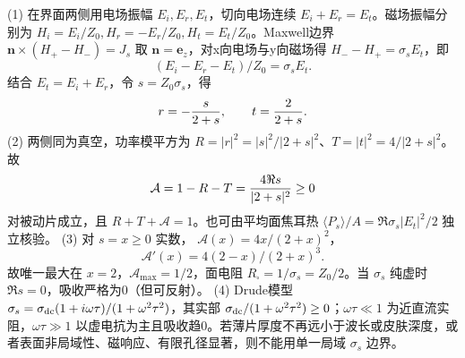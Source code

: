 (1) 在界面两侧用电场振幅 \(E_i,E_r,E_t\)，切向电场连续 \(E_i+E_r=E_t\)。磁场振幅分别为 \(H_i=E_i/Z_0,H_r=-E_r/Z_0,H_t=E_t/Z_0\)。Maxwell边界 \(\boldsymbol n\times(H_+-H_-)=J_s\) 取 \(\boldsymbol n=\boldsymbol e_z\)，对x向电场与y向磁场得 \(H_- -H_+=\sigma_sE_t\)，即
\[
(E_i-E_r-E_t)/Z_0=\sigma_sE_t.
\]
结合 \(E_t=E_i+E_r\)，令 \(s=Z_0\sigma_s\)，得
\[
r=-{s\over2+s},\qquad t={2\over2+s}.
\]
(2) 两侧同为真空，功率模平方为 \(R=|r|^2=|s|^2/|2+s|^2\)、\(T=|t|^2=4/|2+s|^2\)。故
\[
\mathcal A=1-R-T={4\Re s\over|2+s|^2}\ge0
\]
对被动片成立，且 \(R+T+\mathcal A=1\)。也可由平均面焦耳热 \(\langle P_s\rangle/A=\Re\sigma_s|E_t|^2/2\) 独立核验。
(3) 对 \(s=x\ge0\) 实数，
\(\mathcal A(x)=4x/(2+x)^2\)，
\[
\mathcal A'(x)=4(2-x)/(2+x)^3.
\]
故唯一最大在 \(x=2\)，\(\mathcal A_{\max}=1/2\)，面电阻 \(R_\square=1/\sigma_s=Z_0/2\)。当 \(\sigma_s\) 纯虚时 \(\Re s=0\)，吸收严格为0（但可反射）。
(4) Drude模型 \(\sigma_s=\sigma_{\rm dc}(1+i\omega\tau)/(1+\omega^2\tau^2)\)，其实部 \(\sigma_{\rm dc}/(1+\omega^2\tau^2)\ge0\)；\(\omega\tau\ll1\) 为近直流实阻，\(\omega\tau\gg1\) 以虚电抗为主且吸收趋0。若薄片厚度不再远小于波长或皮肤深度，或者表面非局域性、磁响应、有限孔径显著，则不能用单一局域 \(\sigma_s\) 边界。
